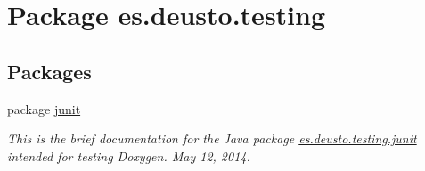 \hypertarget{namespacees_1_1deusto_1_1testing}{}\section{Package es.\+deusto.\+testing}
\label{namespacees_1_1deusto_1_1testing}
\subsection*{Packages}
\begin{DoxyCompactItemize}
\item 
package \hyperlink{namespacees_1_1deusto_1_1testing_1_1junit}{junit}
\begin{DoxyCompactList}\small\item\em This is the brief documentation for the Java package \hyperlink{namespacees_1_1deusto_1_1testing_1_1junit}{es.\+deusto.\+testing.\+junit} intended for testing Doxygen. May 12, 2014. \end{DoxyCompactList}\end{DoxyCompactItemize}
